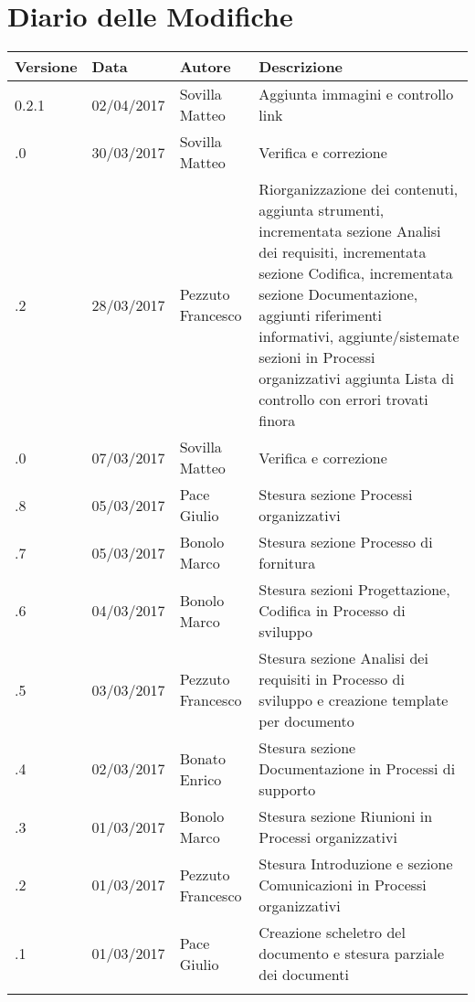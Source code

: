 \section*{Diario delle Modifiche}
\begin{longtabu} to \textwidth {
	X[4,l,p]
	X[4,l,p]
	X[4,l,p]
	X[8,l,p]}
	\toprule
		 Versione & Data & Autore & Descrizione \\
		\midrule
		\endhead
		
		0.2.1 & 02/04/2017 & Sovilla Matteo & Aggiunta immagini e controllo link\\
		\addlinespace[0.2em]
		\midrule
		.0 & 30/03/2017 & Sovilla Matteo & Verifica e correzione\\
		\addlinespace[0.2em]
		\midrule
		.2 & 28/03/2017 & Pezzuto Francesco & Riorganizzazione dei contenuti, aggiunta strumenti, incrementata sezione Analisi dei requisiti, incrementata sezione Codifica, incrementata sezione Documentazione, aggiunti riferimenti informativi, aggiunte/sistemate sezioni in Processi organizzativi aggiunta Lista di controllo con errori trovati finora\\
		\addlinespace[0.2em]
		\midrule
		.0 & 07/03/2017 & Sovilla Matteo & Verifica e correzione\\
		\addlinespace[0.2em]
		\midrule
		.8 & 05/03/2017 & Pace Giulio & Stesura sezione Processi organizzativi\\
		\addlinespace[0.2em]
		\midrule
		.7 & 05/03/2017 & Bonolo Marco & Stesura sezione Processo di fornitura\\
		\addlinespace[0.2em]
		\midrule
		.6 & 04/03/2017 & Bonolo Marco & Stesura sezioni Progettazione, Codifica in Processo di sviluppo\\
		\addlinespace[0.2em]
		\midrule
		.5 & 03/03/2017 & Pezzuto Francesco & Stesura sezione Analisi dei requisiti in Processo di sviluppo e creazione template per documento\\
		\addlinespace[0.2em]
		\midrule
		.4 & 02/03/2017 & Bonato Enrico & Stesura sezione Documentazione in Processi di supporto\\
		\addlinespace[0.2em]
		\midrule
		.3 & 01/03/2017 & Bonolo Marco & Stesura sezione Riunioni in Processi organizzativi\\
		\addlinespace[0.2em]
		\midrule
		.2 & 01/03/2017 & Pezzuto Francesco & Stesura Introduzione e sezione Comunicazioni in Processi organizzativi\\
		\addlinespace[0.2em]
		\midrule
		.1 & 01/03/2017 & Pace Giulio & Creazione scheletro del documento e stesura parziale dei documenti\\
		\addlinespace[0.4em]
		
	\bottomrule
\end{longtabu}